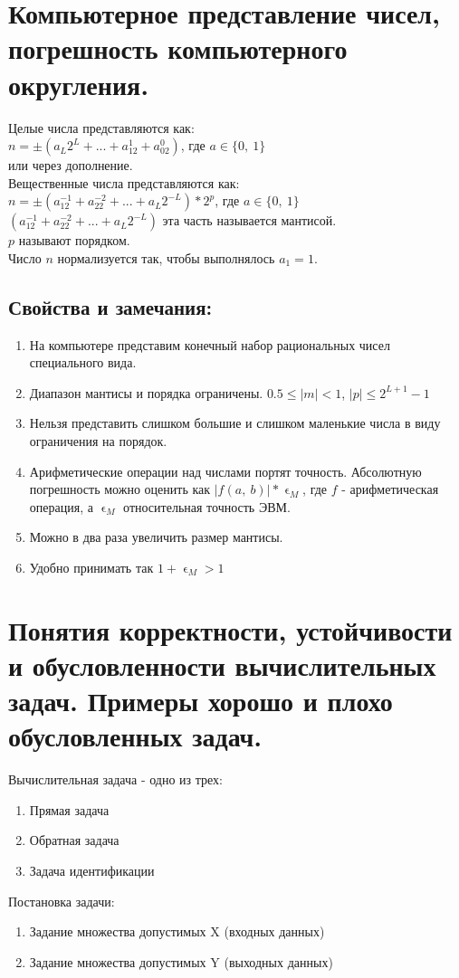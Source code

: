 \documentclass[16pt]{article}
\begin{document}
		\section {Компьютерное представление чисел, погрешность компьютерного округления.}
			Целые числа представляются как:\\
			$n = \pm(a_L2^L+...+a_12^1+a_02^0)$, где $a\in \{0,\ 1\}$\\
			или через дополнение.\\
			Вещественные числа представляются как:\\
			$n = \pm(a_12^{-1} + a_22^{-2} + ... + a_L2^{-L})*2^p$, где $a\in \{0,\ 1\}$\\
			$(a_12^{-1} + a_22^{-2} + ... + a_L2^{-L})$ эта часть называется мантисой.\\
			$p$ называют порядком.\\
			Число $n$ нормализуется так, чтобы выполнялось $a_1=1$.\\
			\subsection{Свойства и замечания:}
			\begin{enumerate}
			\item{На компьютере представим конечный набор рациональных чисел специального вида.}	
			\item{Диапазон мантисы и порядка ограничены. $0.5 \leq |m| < 1$, $|p|\leq 2^{L+1} - 1$}
			\item{Нельзя представить слишком большие и слишком маленькие числа в виду ограничения на порядок.}
			\item{Арифметические операции над числами портят точность. Абсолютную погрешность можно оценить как $|f(a,\ b)|*\upvarepsilon_M$}, где $f$ - арифметическая операция, а $\upvarepsilon_M$ относительная точность ЭВМ.
			\item{Можно в два раза увеличить размер мантисы.}
			\item{Удобно принимать так $1 + \upvarepsilon_M > 1$}
			\end{enumerate}
		\section{Понятия корректности, устойчивости и обусловленности вычислительных задач. Примеры хорошо и плохо обусловленных задач.}
			Вычислительная задача - одно из трех:
			\begin{enumerate}
				\item{Прямая задача}
				\item{Обратная задача}
				\item{Задача идентификации}
			\end{enumerate}
			Постановка задачи:
			\begin{enumerate}
				\item{Задание множества допустимых X (входных данных)}
				\item{Задание множества допустимых Y (выходных данных)}
			\end{enumerate}
\end{document}

